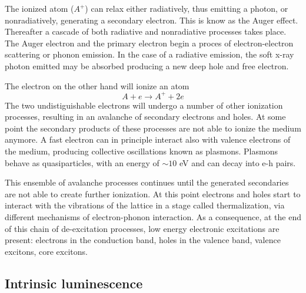 The ionized atom ($A^{+}$) can relax either radiatively, thus emitting a photon, or nonradiatively, generating a secondary electron. This is know as the Auger effect. Thereafter a cascade of both radiative and nonradiative processes takes place.
The Auger electron and the primary electron begin a proces of electron-electron scattering or phonon emission. In the case of a radiative emission, the soft x-ray photon emitted may be absorbed producing a new deep hole and free electron. 

The electron on the other hand will ionize an atom
\begin{equation}
A + e \rightarrow A^{+} + 2e
\end{equation}
The two undistiguishable electrons will undergo a number of other ionization processes, resulting in an avalanche of secondary electrons and holes. At some point the secondary products of these processes are not able to ionize the medium anymore.
A fast electron can in principle interact also with valence electrons of the medium, producing collective oscillations known as plasmons. Plasmons behave as quasiparticles, with an energy of $\sim 10$ eV and can decay into e-h pairs.

This ensemble of avalanche processes continues until the generated secondaries are not able to create further ionization. At this point electrons and holes start to interact with the vibrations of the lattice in a stage called thermalization, via different mechanisms of electron-phonon interaction. 
 As a consequence, at the end of this chain of de-excitation processes, low energy electronic excitations are present: electrons in the conduction band, holes in the valence band, valence excitons, core excitons.
 
\subsection{Intrinsic luminescence}

